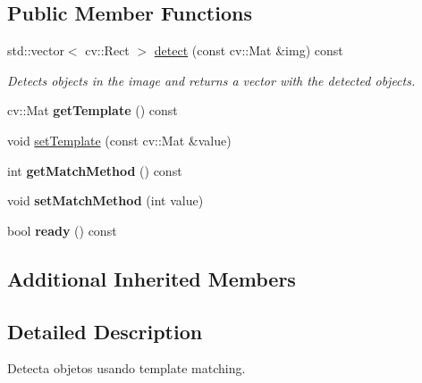 \subsection*{Public Member Functions}
\begin{DoxyCompactItemize}
\item 
std\+::vector$<$ cv\+::\+Rect $>$ \hyperlink{class_viscv_1_1_templ_matching_detector_a1d0c071b6e7a19b192c86ca0e47fd642}{detect} (const cv\+::\+Mat \&img) const 
\begin{DoxyCompactList}\small\item\em Detects objects in the image and returns a vector with the detected objects. \end{DoxyCompactList}\item 
\hypertarget{class_viscv_1_1_templ_matching_detector_ad885725f17a30d91f02f762a83e0df22}{}cv\+::\+Mat {\bfseries get\+Template} () const \label{class_viscv_1_1_templ_matching_detector_ad885725f17a30d91f02f762a83e0df22}

\item 
void \hyperlink{class_viscv_1_1_templ_matching_detector_a60a256669585256ac591f9b7c1e0bbf2}{set\+Template} (const cv\+::\+Mat \&value)
\item 
\hypertarget{class_viscv_1_1_templ_matching_detector_a634e061907a567a2412dd2be2f2bd24c}{}int {\bfseries get\+Match\+Method} () const \label{class_viscv_1_1_templ_matching_detector_a634e061907a567a2412dd2be2f2bd24c}

\item 
\hypertarget{class_viscv_1_1_templ_matching_detector_aec8c39e71fdcbc008cf3ee4a98546993}{}void {\bfseries set\+Match\+Method} (int value)\label{class_viscv_1_1_templ_matching_detector_aec8c39e71fdcbc008cf3ee4a98546993}

\item 
\hypertarget{class_viscv_1_1_templ_matching_detector_a9fb588fd953e06ac889fc2789a5d3467}{}bool {\bfseries ready} () const \label{class_viscv_1_1_templ_matching_detector_a9fb588fd953e06ac889fc2789a5d3467}

\end{DoxyCompactItemize}
\subsection*{Additional Inherited Members}


\subsection{Detailed Description}
Detecta objetos usando template matching. 


